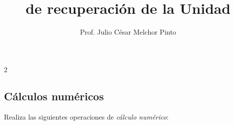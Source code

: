 \documentclass[12pt,examen,answers]{repaso_layout}
\title{de {\color{brown}recuperación} de la Unidad}
\author{Prof. Julio César Melchor Pinto}
\begin{document}
%
\begin{multicols}{2}
	\tableofcontents
\end{multicols}\newpage
\begin{questions}\large%
	\section{Cálculos numéricos}

      \question[10] Realiza las siguientes operaciones de \textit{cálculo numérico}:
   
      \begin{parts}
\end{parts}
\end{questions}
\end{document}
